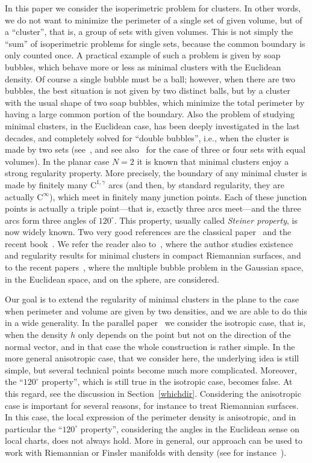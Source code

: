 \documentclass[11pt]{article}
\newcommand{\ie}{i.e.,\xspace}
\numberwithin{equation}{section}
\theoremstyle{plain}
\theoremstyle{definition}
\begin{document}
In this paper we consider the isoperimetric problem for clusters. In other words, we do not want to minimize the perimeter of a single set of given volume, but of a ``cluster'', that is, a group of sets with given volumes. This is not simply the ``sum'' of isoperimetric problems for single sets, because the common boundary is only counted once. A practical example of such a problem is given by soap bubbles, which behave more or less as minimal clusters with the Euclidean density. Of course a single bubble must be a ball; however, when there are two bubbles, the best situation is not given by two distinct balls, but by a cluster with the usual shape of two soap bubbles, which minimize the total perimeter by having a large common portion of the boundary. Also the problem of studying minimal clusters, in the Euclidean case, has been deeply investigated in the last decades, and completely solved for ``double bubbles'', \ie when the cluster is made by two sets (see~\cite{FABHZ,HMRR,Rei}, and see also~\cite{W,PT0,PT1,PT2} for the case of three or four sets with equal volumes). In the planar case $N=2$ it is known that minimal clusters enjoy a strong regularity property. More precisely, the boundary of any minimal cluster is made by finitely many $\mathrm{C}^{1,\gamma}$ arcs (and then, by standard regularity, they are actually $\mathrm{C}^\infty$), which meet in finitely many junction points. Each of these junction points is actually a triple point---that is, exactly three arcs meet---and the three arcs form three angles of $120^\circ$. This property, usually called \emph{Steiner property}, is now widely known. Two very good references are the classical paper~\cite{Tay} and the recent book~\cite{Mag}. We refer the reader also to~\cite{M94}, where the author studies existence and regularity results for minimal clusters in compact Riemannian surfaces, and to the recent papers~\cite{MN,MN2}, where the multiple bubble problem in the Gaussian space, in the Euclidean space, and on the sphere, are considered.

Our goal is to extend the regularity of minimal clusters in the plane to the case when perimeter and volume are given by two densities, and we are able to do this in a wide generality. In the parallel paper~\cite{FPS1} we consider the isotropic case, that is, when the density $h$ only depends on the point but not on the direction of the normal vector, and in that case the whole construction is rather simple. In the more general anisotropic case, that we consider here, the underlying idea is still simple, but several technical points become much more complicated. Moreover, the ``$120^\circ$ property'', which is still true in the isotropic case, becomes false. At this regard, see the discussion in Section~\ref{whichdir}. Considering the anisotropic case is important for several reasons, for instance to treat Riemannian surfaces. In this case, the local expression of the perimeter density is anisotropic, and in particular the ``$120^\circ$ property'', considering the angles in the Euclidean sense on local charts, does not always hold. More in general, our approach can be used to work with Riemannian or Finsler manifolds with density (see for instance~\cite{Morganbook}).
\end{document}
